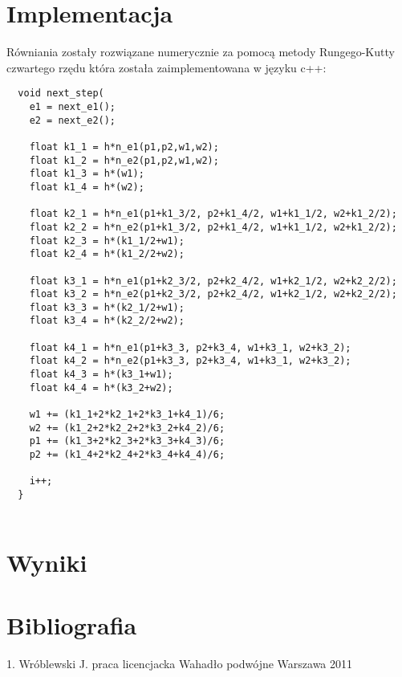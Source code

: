 \documentclass[11pt]{aghdpl}
\begin{document}
\section{Implementacja}
Równiania zostały rozwiązane numerycznie za pomocą metody Rungego-Kutty czwartego rzędu która została zaimplementowana w języku c++:
\begin{lstlisting}
  void next_step(
    e1 = next_e1();
    e2 = next_e2();

    float k1_1 = h*n_e1(p1,p2,w1,w2);
    float k1_2 = h*n_e2(p1,p2,w1,w2);
    float k1_3 = h*(w1);
    float k1_4 = h*(w2);

    float k2_1 = h*n_e1(p1+k1_3/2, p2+k1_4/2, w1+k1_1/2, w2+k1_2/2);
    float k2_2 = h*n_e2(p1+k1_3/2, p2+k1_4/2, w1+k1_1/2, w2+k1_2/2);
    float k2_3 = h*(k1_1/2+w1);
    float k2_4 = h*(k1_2/2+w2);

    float k3_1 = h*n_e1(p1+k2_3/2, p2+k2_4/2, w1+k2_1/2, w2+k2_2/2);
    float k3_2 = h*n_e2(p1+k2_3/2, p2+k2_4/2, w1+k2_1/2, w2+k2_2/2);
    float k3_3 = h*(k2_1/2+w1);
    float k3_4 = h*(k2_2/2+w2);

    float k4_1 = h*n_e1(p1+k3_3, p2+k3_4, w1+k3_1, w2+k3_2);
    float k4_2 = h*n_e2(p1+k3_3, p2+k3_4, w1+k3_1, w2+k3_2);
    float k4_3 = h*(k3_1+w1);
    float k4_4 = h*(k3_2+w2);

    w1 += (k1_1+2*k2_1+2*k3_1+k4_1)/6;
    w2 += (k1_2+2*k2_2+2*k3_2+k4_2)/6;
    p1 += (k1_3+2*k2_3+2*k3_3+k4_3)/6;
    p2 += (k1_4+2*k2_4+2*k3_4+k4_4)/6;

    i++;
  }


\end{lstlisting}

\section{Wyniki}






\section{Bibliografia}
1. Wróblewski J. praca licencjacka Wahadło podwójne Warszawa 2011
\end{document}
